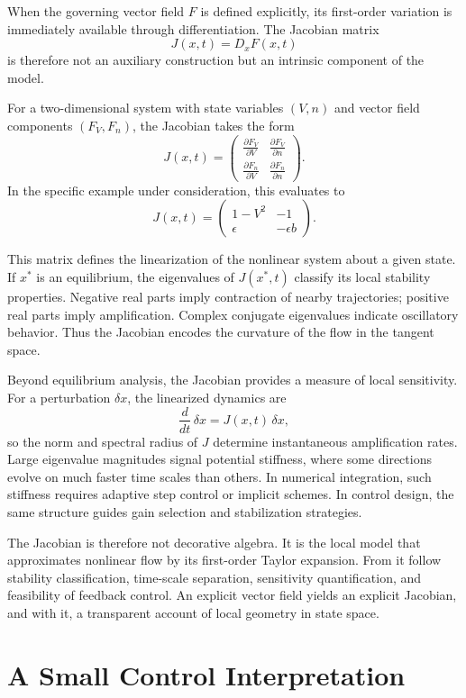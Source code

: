 \documentclass[12pt]{book}
\begin{document}
When the governing vector field $F$ is defined explicitly, its
first-order variation is immediately available through differentiation.
The Jacobian matrix
\[
J(x,t) = D_x F(x,t)
\]
is therefore not an auxiliary construction but an intrinsic component
of the model.

For a two-dimensional system with state variables $(V,n)$ and vector
field components $(F_V, F_n)$, the Jacobian takes the form
\[
J(x,t)
=
\begin{pmatrix}
\frac{\partial F_V}{\partial V} & \frac{\partial F_V}{\partial n} \\[6pt]
\frac{\partial F_n}{\partial V} & \frac{\partial F_n}{\partial n}
\end{pmatrix}.
\]
In the specific example under consideration, this evaluates to
\[
J(x,t)
=
\begin{pmatrix}
1 - V^2 & -1 \\
\epsilon & -\epsilon b
\end{pmatrix}.
\]

This matrix defines the linearization of the nonlinear system about a
given state. If $x^*$ is an equilibrium, the eigenvalues of
$J(x^*,t)$ classify its local stability properties. Negative real
parts imply contraction of nearby trajectories; positive real parts
imply amplification. Complex conjugate eigenvalues indicate oscillatory
behavior. Thus the Jacobian encodes the curvature of the flow in the
tangent space.

Beyond equilibrium analysis, the Jacobian provides a measure of local
sensitivity. For a perturbation $\delta x$, the linearized dynamics are
\[
\frac{d}{dt}\,\delta x = J(x,t)\,\delta x,
\]
so the norm and spectral radius of $J$ determine instantaneous
amplification rates. Large eigenvalue magnitudes signal potential
stiffness, where some directions evolve on much faster time scales
than others. In numerical integration, such stiffness requires adaptive
step control or implicit schemes. In control design, the same structure
guides gain selection and stabilization strategies.

The Jacobian is therefore not decorative algebra. It is the local model
that approximates nonlinear flow by its first-order Taylor expansion.
From it follow stability classification, time-scale separation,
sensitivity quantification, and feasibility of feedback control.
An explicit vector field yields an explicit Jacobian, and with it,
a transparent account of local geometry in state space.

\section{A Small Control Interpretation}
\end{document}
